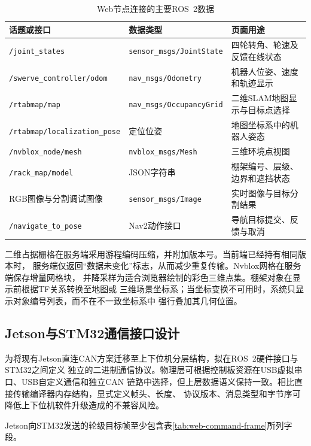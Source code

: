 \begin{table}[htbp]
    \centering
    \caption{Web节点连接的主要ROS~2数据}
    \label{tab:web-ros-topics}
    \begin{tabularx}{\textwidth}{p{5.1cm}p{4.0cm}X}
        \toprule
        话题或接口 & 数据类型 & 页面用途 \\
        \midrule
        \texttt{/joint\_states} & \texttt{sensor\_msgs/JointState} & 四轮转角、轮速及反馈在线状态 \\
        \texttt{/swerve\_controller/odom} & \texttt{nav\_msgs/Odometry} & 机器人位姿、速度和轨迹显示 \\
        \texttt{/rtabmap/map} & \texttt{nav\_msgs/OccupancyGrid} & 二维SLAM地图显示与目标点选择 \\
        \texttt{/rtabmap/localization\_pose} & 定位位姿 & 地图坐标系中的机器人姿态 \\
        \texttt{/nvblox\_node/mesh} & \texttt{nvblox\_msgs/Mesh} & 三维环境点视图 \\
        \texttt{/rack\_map/model} & JSON字符串 & 棚架编号、层级、边界和遮挡状态 \\
        RGB图像与分割调试图像 & \texttt{sensor\_msgs/Image} & 实时图像与目标分割结果 \\
        \texttt{/navigate\_to\_pose} & Nav2动作接口 & 导航目标提交、反馈与取消 \\
        \bottomrule
    \end{tabularx}
\end{table}

二维占据栅格在服务端采用游程编码压缩，并附加版本号。当前端已经持有相同版本时，
服务端仅返回“数据未变化”标志，从而减少重复传输。Nvblox网格在服务端保存增量网格块，
并降采样为适合浏览器绘制的彩色三维点集。棚架对象在显示前根据TF关系转换至地图或
三维场景坐标系；当坐标变换不可用时，系统只显示对象编号列表，而不在不一致坐标系中
强行叠加其几何位置。

\subsection{Jetson与STM32通信接口设计}

为将现有Jetson直连CAN方案迁移至上下位机分层结构，拟在ROS~2硬件接口与STM32之间定义
独立的二进制通信协议。物理层可根据控制板资源在USB虚拟串口、USB自定义通信和独立CAN
链路中选择，但上层数据语义保持一致。相比直接传输编译器内存结构，显式定义帧头、长度、
协议版本、消息类型和字节序可降低上下位机软件升级造成的不兼容风险。

Jetson向STM32发送的轮级目标帧至少包含表\ref{tab:web-command-frame}所列字段。

